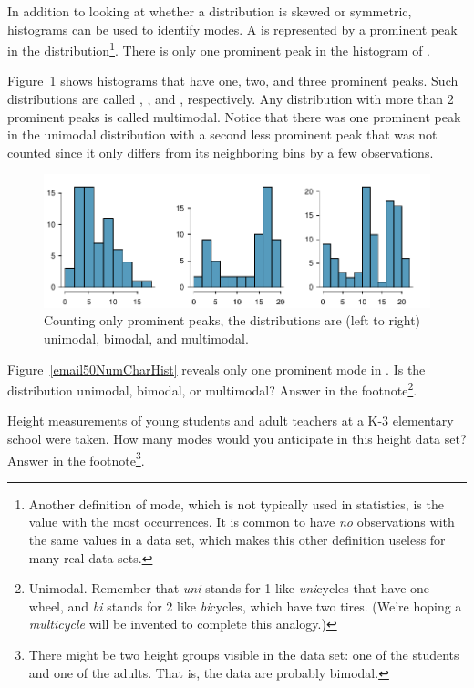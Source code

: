 In addition to looking at whether a distribution is skewed or symmetric, histograms can be used to identify modes. A  is represented by a prominent peak in the distribution\footnote{Another definition of mode, which is not typically used in statistics, is the value with the most occurrences. It is common to have \emph{no} observations with the same values in a data set, which makes this other definition useless for many real data sets.}. There is only one prominent peak in the histogram of .

Figure~\ref{singleBiMultiModalPlots} shows histograms that have one, two, and three prominent peaks. Such distributions are called , , and , respectively. Any distribution with more than 2 prominent peaks is called multimodal. Notice that there was one prominent peak in the unimodal distribution with a second less prominent peak that was not counted since it only differs from its neighboring bins by a few observations.
\begin{figure}[h]
   \centering
   \includegraphics[width=\textwidth]{01/figures/singleBiMultiModalPlots/singleBiMultiModalPlots}
   \caption{Counting only prominent peaks, the distributions are (left to right) unimodal, bimodal, and multimodal.}
   \label{singleBiMultiModalPlots}
\end{figure}

\begin{exercise}
Figure~\ref{email50NumCharHist} reveals only one prominent mode in . Is the distribution unimodal, bimodal, or multimodal? Answer in the footnote\footnote{Unimodal. Remember that \emph{uni} stands for 1 like \emph{uni}cycles that have one wheel, and \emph{bi} stands for 2 like \emph{bi}cycles, which have two tires. (We're hoping a \emph{multicycle} will be invented to complete this analogy.)}.
\end{exercise}

\begin{exercise}
Height measurements of young students and adult teachers at a K-3 elementary school were taken. How many modes would you anticipate in this height data set? Answer in the footnote\footnote{There might be two height groups visible in the data set: one of the students and one of the adults. That is, the data are probably bimodal.}.
\end{exercise}

